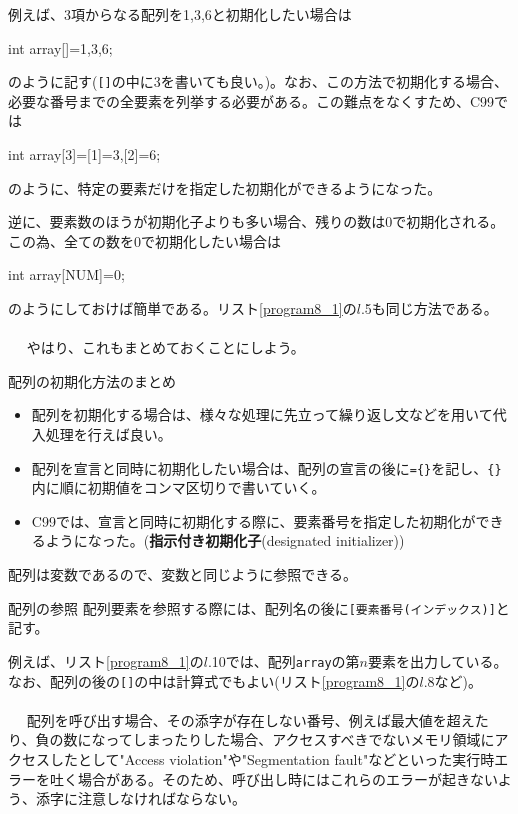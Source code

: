 例えば、3項からなる配列を1,3,6と初期化したい場合は
\begin{code}
int array[]={1,3,6};
\end{code}
のように記す(\verb|[]|の中に3を書いても良い。)。なお、この方法で初期化する場合、必要な番号までの全要素を列挙する必要がある。この難点をなくすため、C99では
\begin{code}
int array[3]={[1]=3,[2]=6};
\end{code}
のように、特定の要素だけを指定した初期化ができるようになった。

逆に、要素数のほうが初期化子よりも多い場合、残りの数は0で初期化される。この為、全ての数を0で初期化したい場合は
\begin{code}
int array[NUM]={0};
\end{code}
のようにしておけば簡単である。リスト\ref{program8_1}の$l$.5も同じ方法である。
\\ \\　
やはり、これもまとめておくことにしよう。
\begin{itembox}[l]{配列の初期化方法のまとめ}
\begin{itemize}
\item 配列を初期化する場合は、様々な処理に先立って繰り返し文などを用いて代入処理を行えば良い。
\item 配列を宣言と同時に初期化したい場合は、配列の宣言の後に\verb|={}|を記し、\verb|{}|内に順に初期値をコンマ区切りで書いていく。
\item C99では、宣言と同時に初期化する際に、要素番号を指定した初期化ができるようになった。(\textbf{指示付き初期化子}(designated initializer))
\end{itemize}
\end{itembox}

配列は変数であるので、変数と同じように参照できる。
\begin{itembox}[l]{配列の参照}
配列要素を参照する際には、配列名の後に\verb|[要素番号(インデックス)]|と記す。
\end{itembox}

例えば、リスト\ref{program8_1}の$l$.10では、配列\verb|array|の第$n$要素を出力している。なお、配列の後の\verb|[]|の中は計算式でもよい(リスト\ref{program8_1}の$l$.8など)。
\\ \\　
配列を呼び出す場合、その添字が存在しない番号、例えば最大値を超えたり、負の数になってしまったりした場合、アクセスすべきでないメモリ領域にアクセスしたとして"Access violation"や"Segmentation fault"などといった実行時エラーを吐く場合がある。そのため、呼び出し時にはこれらのエラーが起きないよう、添字に注意しなければならない。

